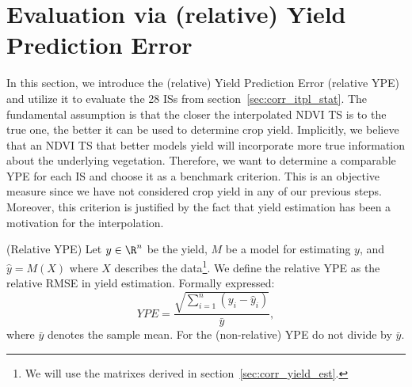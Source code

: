 \section{Evaluation via (relative) Yield Prediction Error}{
    \label{sec:ndvi_corr_eval}
    In this section, we introduce the (relative) Yield Prediction Error (relative YPE) and utilize it to evaluate the 28 {{IS}}s from section~\ref{sec:corr_itpl_stat}. 
    The fundamental assumption is that the closer the interpolated NDVI {TS} is to the true one, the better it can be used to determine crop yield. Implicitly, we believe that an NDVI {TS} that better models yield will incorporate more true information about the underlying vegetation. 
    Therefore, we want to determine a comparable YPE for each {{IS}} and choose it as a benchmark criterion. 
    This is an objective measure since we have not considered crop yield in any of our previous steps. Moreover, this criterion is justified by the fact that yield estimation has been a motivation for the interpolation.

    \begin{definition}(Relative YPE) \label{def:YPE}
        Let $y\in \R^n$ be the yield, $M$ be a model for estimating $y$, and $\hat y = M(X)$ where $X$ describes the data\footnote{We will use the matrixes derived in section~\ref{sec:corr_yield_est}.}. 
        We define the relative YPE as the relative RMSE in yield estimation. Formally expressed:
        \begin{equation}
            YPE = \frac{\sqrt{\sum_{i=1}^n(y_i - \hat y_i)}}{\bar y}, %
        \end{equation}
        where $\bar y$ denotes the sample mean. For the (non-relative) YPE do not divide by $\bar y$.
    \end{definition}

}
